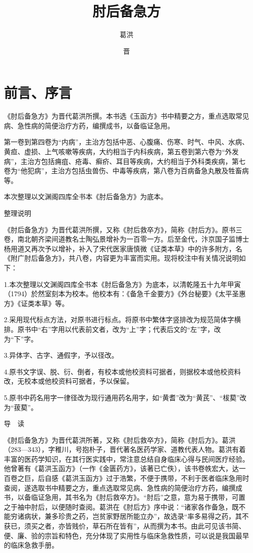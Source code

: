 \documentclass[12pt,UTF8]{ctexbook}
\title{\heiti\zihao{0} 肘后备急方}
\author{葛洪}
\date{晋}
\begin{document}
\maketitle
\tableofcontents

\frontmatter
\chapter{前言、序言}

《肘后备急方》为晋代葛洪所撰。本书选《玉函方》书中精要之方，重点选取常见病、急性病的简便治疗方药，编撰成书，以备临证急用。

第一卷到第四卷为“内病”，主治方包括中恶、心腹痛、伤寒、时气、中风、水病、黄疸、虚损、上气咳嗽等疾病，大约相当于内科疾病，第五卷到第六卷为“外发病”，主治方包括痈疽、疮毒、癣疥、耳目等疾病，大约相当于外科类疾病，第七卷为“他犯病”，主治方包括虫兽伤、中毒等疾病，第八卷为百病备急丸散及牲畜病等。

本次整理以文渊阁四库全书本《肘后备急方》为底本。





整理说明

《肘后备急方》为晋代葛洪所撰，又称《肘后救卒方》，简称《肘后方》。原书三卷，南北朝齐梁间道教名士陶弘景增补为一百零一方。后至金代，汴京国子监博士杨用道又再次予以增补，补入了宋代医家唐慎微《证类本草》中的许多附方，名《附广肘后备急方》，共八卷，内容更为丰富而实用。现将校注中有关情况说明如下：

1.本次整理以文渊阁四库全书本《肘后备急方》为底本，以清乾隆五十九年甲寅（1794）於然室刻本为校本。他校本有：《备急千金要方》《外台秘要》《太平圣惠方》《证类本草》等。

2.采用现代标点方法，对原书进行标点。将原书中繁体字竖排改为规范简体字横排。原书中“右”字用以代表前文者，改为“上”字；代表后文的“左”字，改为“下”字。

3.异体字、古字、通假字，予以径改。

4.原书文字误、脱、衍、倒者，有校本或他校资料可据者，则据校本或他校资料改，无校本或他校资料可据者，予以保留。

5.原书中药名用字一律径改为现行通用药名用字，如“黄耆”改为“黄芪”、“柭葜”改为“菝葜”。





导　读

《肘后备急方》为晋代葛洪所著，又称《肘后救卒方》，简称《肘后方》。葛洪（283—343），字稚川，号抱朴子，晋代著名医药学家、道教代表人物。葛洪有着丰富的医药学知识，在其行医实践中，常注意总结自身临床心得与民间医疗经验。他曾著有《葛洪玉函方》（一作《金匮药方》，该著已亡佚），该书卷帙宏大，达一百卷之巨，后自感《葛洪玉函方》过于浩繁，不便于携带，不利于医者临床急用时查阅，遂选取书中精要之方，重点选取常见病、急性病的简便治疗方药，编撰成书，以备临证急用，其书名为《肘后救卒方》。“肘后”之意，意为易于携带，可置之于袖中肘后，以便随时查阅。葛洪在《肘后方》序中说：“诸家各作备急，既不能穷诸病状，兼多珍贵之药，岂贫家野居所能立办”，故选录“率多易得之药，其不获已，须买之者，亦皆贱价，草石所在皆有”，从而撰为本书。由此可见该书简、便、廉、验的宗旨和特色，充分体现了实用性与临床急救性质，可以说是我国最早的临床急救手册。
\end{document}
